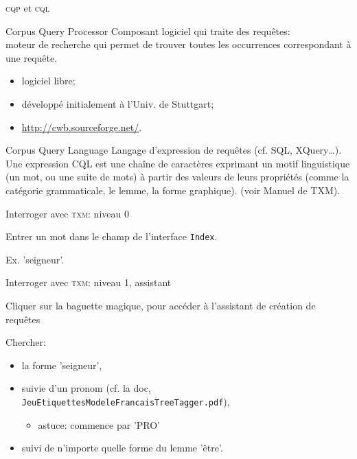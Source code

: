 \documentclass{beamer}
\begin{document}
\begin{frame}{\textsc{cqp} et \textsc{cql}}
	
	\begin{block}{Corpus Query Processor}
		Composant logiciel qui traite des requêtes:\\
		moteur de recherche qui permet de trouver toutes les occurrences
		correspondant à une requête.
		
		\begin{itemize}
			\item logiciel libre;
			\item développé initialement à l'Univ. de Stuttgart;
			\item \url{http://cwb.sourceforge.net/}.
		\end{itemize}
		
	\end{block}

	\begin{block}{Corpus Query Language}
		Langage d'expression de requêtes (cf. SQL, XQuery…).\\
		Une expression CQL est une chaîne de caractères exprimant un motif
		linguistique (un mot, ou une suite de mots) à partir des valeurs de leurs propriétés (comme la
		catégorie grammaticale, le lemme, la forme graphique). (voir Manuel de TXM).
	\end{block}
	
\end{frame}

\begin{frame}{Interroger avec \textsc{txm}: niveau 0}
	
	Entrer un mot dans le champ de l'interface \texttt{Index}.
	
	Ex. 'seigneur'.
	
\end{frame}

\begin{frame}{Interroger avec \textsc{txm}: niveau 1, assistant}

Cliquer sur la baguette magique, pour accéder à l'assistant de création de requêtes

Chercher:
\begin{itemize}
	\item la forme 'seigneur',
	\item suivie d'un pronom (cf. la doc, \\ \texttt{JeuEtiquettesModeleFrancaisTreeTagger.pdf}),
		\begin{itemize}
			\item astuce: commence par 'PRO'
		\end{itemize}
	\item suivi de n'importe quelle forme du lemme 'être'.
\end{itemize}


\end{frame}
\end{document}
